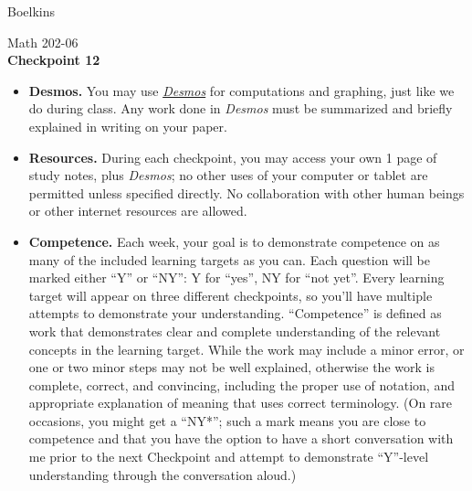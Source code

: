 \documentclass[11 pt]{article}
\begin{document}
 \hfill Boelkins \\
 
\begin{center}
Math 202-06 \\
{\bf Checkpoint 12}
\end{center}



\begin{itemize}
	
	\item {\bf Desmos.} You may use \href{https://www.desmos.com/calculator}{\emph{Desmos}} for computations and graphing, just like we do during class.  Any work done in \emph{Desmos} must be summarized and briefly explained in writing on your paper.  
	
	\item {\bf Resources.} During each checkpoint, you may access your own 1 page of study notes, plus \emph{Desmos}; no other uses of your computer or tablet are permitted unless specified directly.  No collaboration with other human beings or other internet resources are allowed.
	
	
	\item {\bf Competence.} Each week, your goal is to demonstrate competence on as many of the included learning targets as you can.  Each question will be marked either ``Y'' or ``NY'': Y for ``yes'', NY for ``not yet''.  Every learning target will appear on three different checkpoints, so you'll have multiple attempts to demonstrate your understanding.  ``Competence'' is defined as work that demonstrates clear and complete understanding of the relevant concepts in the learning target. While the work may include a minor error, or one or two minor steps may not be well explained, otherwise the work is complete, correct, and convincing, including the proper use of notation, and appropriate explanation of meaning that uses correct terminology.  (On rare occasions, you might get a ``NY*''; such a mark means you are close to competence and that you have the option to have a short conversation with me prior to the next Checkpoint and attempt to demonstrate ``Y''-level understanding through the conversation aloud.)	
\end{itemize}

\noindent \hrulefill \\
\end{document}
